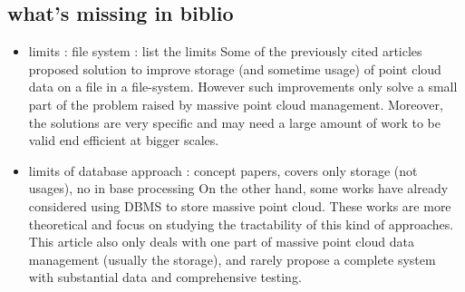 	\subsection{what's missing in biblio} 
		\begin{itemize}
			\item limits : file system : list the limits
			Some of the previously cited articles proposed solution to improve storage (and sometime usage) of point cloud data on a file in a file-system.
			However such improvements only solve a small part of the problem raised by massive point cloud management.
			Moreover, the solutions are very specific and may need a large amount of work to be valid end efficient at bigger scales.
			\item limits of database approach : concept papers, covers only storage (not usages), no in base processing 
			On the other hand, some works have already considered using DBMS to store massive point cloud. These works are more theoretical and focus on studying the tractability of this kind of approaches. 
			This article also only deals with one part of massive point cloud data management (usually the storage), and rarely propose a complete system with substantial data and comprehensive testing.
			
		\end{itemize} 
